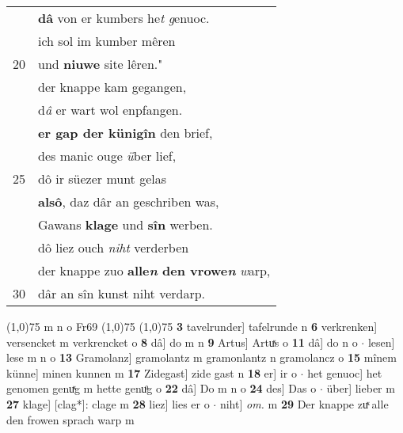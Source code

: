 \documentclass[8pt,a4paper,notitlepage]{article}
\begin{document}
\begin{table}[ht]
\begin{minipage}[t]{0.5\linewidth}
\begin{tabular}{rl}
 & \textbf{dâ} von er kumbers he\textit{t} \textit{g}enuoc.\\ 
 & ich sol im kumber mêren\\ 
20 & und \textbf{niuwe} site lêren."\\ 
 & der knappe kam gegangen,\\ 
 & d\textit{â} er wart wol enpfangen.\\ 
 & \textbf{er gap der künigîn} den brief,\\ 
 & des manic ouge \textit{ü}ber lief,\\ 
25 & dô ir süezer munt gelas\\ 
 & \textbf{alsô}, daz dâr an geschriben was,\\ 
 & Gawans \textbf{klage} und \textbf{sîn} werben.\\ 
 & dô liez ouch \textit{niht} verderben\\ 
 & der knappe zuo \textbf{alle\textit{n} den vrowe\textit{n}} \textit{w}arp,\\ 
30 & dâr an sîn kunst niht verdarp.\\ 
\end{tabular}
\scriptsize
\line(1,0){75} \newline
m n o Fr69 \newline
\line(1,0){75} \newline
\newline
\line(1,0){75} \newline
\textbf{3} tavelrunder] tafelrunde n \textbf{6} verkrenken] versencket m verkrencket o \textbf{8} dâ] do m n \textbf{9} Artus] Artuͯs o \textbf{11} dâ] do n o  $\cdot$ lesen] lese m n o \textbf{13} Gramolanz] gramolantz m gramonlantz n gramolancz o \textbf{15} mînem künne] minen kunnen m \textbf{17} Zidegast] zide gast n \textbf{18} er] ir o  $\cdot$ het genuoc] het genomen genuͯg m hette genuͦg o \textbf{22} dâ] Do m n o \textbf{24} des] Das o  $\cdot$ über] lieber m \textbf{27} klage] [clag*]: clage m \textbf{28} liez] lies er o  $\cdot$ niht] \textit{om.} m \textbf{29} Der knappe zuͯ alle den frowen sprach warp m \newline
\end{minipage}
\end{table}
\newpage
\end{document}
